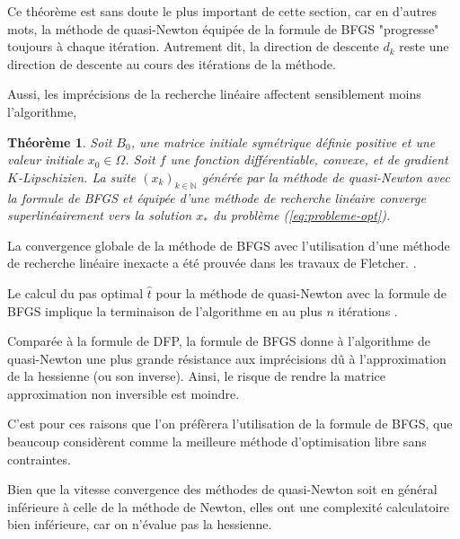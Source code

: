 \documentclass[3p, twocolumn]{elsarticle}
\newtheorem{thm}{Théorème}
\begin{document}
Ce théorème est sans doute le plus important de cette section, car en d'autres mots, la méthode de quasi-Newton équipée de la formule de BFGS "progresse" toujours à chaque itération. Autrement dit, la direction de descente $d_k$ reste une direction de descente au cours des itérations de la méthode. 

Aussi, les imprécisions de la recherche linéaire affectent sensiblement moins l'algorithme, 

\begin{thm}
    Soit $B_0$, une matrice initiale symétrique définie positive et une valeur initiale $x_0\in\Omega$. Soit $f$ une fonction différentiable, convexe, et de gradient $K$-Lipschizien. La suite $(x_k)_{k\in \mathbb{N}}$ générée par la méthode de quasi-Newton avec la formule de BFGS et équipée d'une méthode de recherche linéaire converge superlinéairement vers la solution $x_*$ du problème (\ref{eq:probleme-opt}).
\end{thm}
\begin{pf}
    La convergence globale de la méthode de BFGS avec l'utilisation d'une méthode de recherche linéaire inexacte a été prouvée dans les travaux de Fletcher. \cite{book:Fletcher_1987}.
\end{pf}

\begin{rmk}
    Le calcul du pas optimal $\hat t$ pour la méthode de quasi-Newton avec la formule de BFGS implique la terminaison de l'algorithme en au plus $n$ itérations \cite{book:Fletcher_1987}.
\end{rmk}

Comparée à la formule de DFP, la formule de BFGS donne à l'algorithme de quasi-Newton une plus grande résistance aux imprécisions dû à l'approximation de la hessienne (ou son inverse). Ainsi, le risque de rendre la matrice approximation non inversible est moindre. 

C'est pour ces raisons que l'on préfèrera l'utilisation de la formule de BFGS, que beaucoup considèrent comme la meilleure méthode d'optimisation libre sans contraintes.

Bien que la vitesse convergence des méthodes de quasi-Newton soit en général inférieure à celle de la méthode de Newton, elles ont une complexité calculatoire bien inférieure, car on n'évalue pas la hessienne. 
\end{document}
